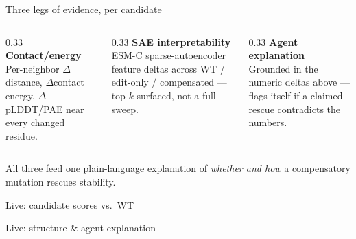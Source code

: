 \documentclass[aspectratio=169]{beamer}
\begin{document}
\begin{frame}{Three legs of evidence, per candidate}
  \begin{columns}
    \begin{column}{0.33\textwidth}
      \centering\textbf{Contact/energy}\\[0.3em]
      \small Per-neighbor $\Delta$distance, $\Delta$contact energy,
      $\Delta$pLDDT/PAE near every changed residue.
    \end{column}
    \begin{column}{0.33\textwidth}
      \centering\textbf{SAE interpretability}\\[0.3em]
      \small ESM-C sparse-autoencoder feature deltas across
      WT / edit-only / compensated --- top-$k$ surfaced, not a full sweep.
    \end{column}
    \begin{column}{0.33\textwidth}
      \centering\textbf{Agent explanation}\\[0.3em]
      \small Grounded in the numeric deltas above --- flags itself if a
      claimed rescue contradicts the numbers.
    \end{column}
  \end{columns}
  \vspace{1em}
  \centering\small
  All three feed one plain-language explanation of \emph{whether and how}
  a compensatory mutation rescues stability.
\end{frame}

\begin{frame}{Live: candidate scores vs.\ WT}
  \centering
\end{frame}

\begin{frame}{Live: structure \& agent explanation}
  \centering
\end{frame}
\end{document}
